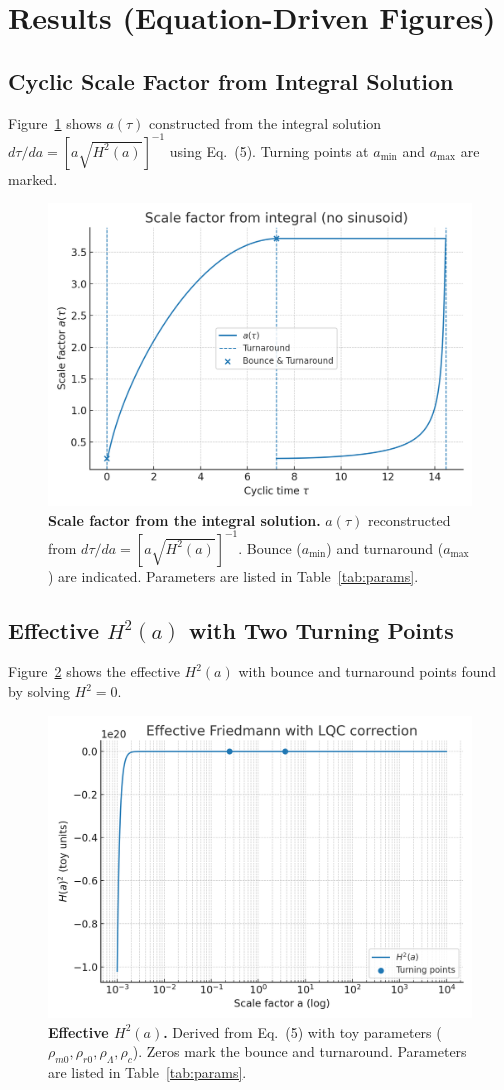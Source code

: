 \documentclass[12pt]{article}
\begin{document}
\section{Results (Equation-Driven Figures)}
\subsection{Cyclic Scale Factor from Integral Solution}
Figure~\ref{fig:atau} shows $a(\tau)$ constructed from the integral solution 
$d\tau/da=[a\sqrt{H^2(a)}]^{-1}$ using Eq.~(5). Turning points at $a_{\min}$ and $a_{\max}$ are marked.

\begin{figure}[h]
\centering
\includegraphics[width=0.78\linewidth]{figures/plot_a_tau_from_integral.png}
\caption{\textbf{Scale factor from the integral solution.} $a(\tau)$ reconstructed from 
$d\tau/da=[a\sqrt{H^2(a)}]^{-1}$. Bounce ($a_{\min}$) and turnaround ($a_{\max}$) are indicated. 
Parameters are listed in Table~\ref{tab:params}.}
\label{fig:atau}
\end{figure}

\subsection{Effective $H^2(a)$ with Two Turning Points}
Figure~\ref{fig:h2a} shows the effective $H^2(a)$ with bounce and turnaround points found by solving $H^2=0$.

\begin{figure}[h]
\centering
\includegraphics[width=0.78\linewidth]{figures/plot_H2_from_params.png}
\caption{\textbf{Effective $H^2(a)$.} Derived from Eq.~(5) with toy parameters 
($\rho_{m0},\rho_{r0},\rho_\Lambda,\rho_c$). Zeros mark the bounce and turnaround. 
Parameters are listed in Table~\ref{tab:params}.}
\label{fig:h2a}
\end{figure}
\end{document}
